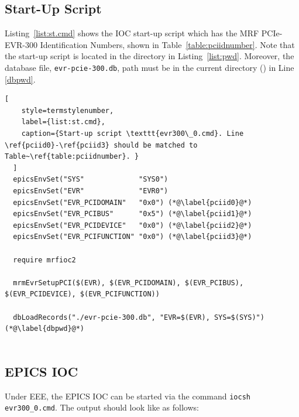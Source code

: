 \documentclass[11pt
  , a4paper
  , article
  , oneside
  , showtrims
]{memoir}
\begin{document}
\subsection{Start-Up Script}
Listing~\ref{list:st.cmd} shows the IOC start-up script which has the MRF PCIe-EVR-300 Identification Numbers, shown in Table~\ref{table:pciidnumber}. Note that the start-up script is located in the directory in Listing~\ref{list:pwd}. Moreover, the database file, \texttt{evr-pcie-300.db}, path must be in the current directory () in Line \ref{dbpwd}.


\begin{lstlisting}[
    style=termstylenumber,
    label={list:st.cmd},
    caption={Start-up script \texttt{evr300\_0.cmd}. Line \ref{pciid0}-\ref{pciid3} should be matched to Table~\ref{table:pciidnumber}. }
  ]
  epicsEnvSet("SYS"             "SYS0")
  epicsEnvSet("EVR"             "EVR0")
  epicsEnvSet("EVR_PCIDOMAIN"   "0x0") (*@\label{pciid0}@*)
  epicsEnvSet("EVR_PCIBUS"      "0x5") (*@\label{pciid1}@*)
  epicsEnvSet("EVR_PCIDEVICE"   "0x0") (*@\label{pciid2}@*)
  epicsEnvSet("EVR_PCIFUNCTION" "0x0") (*@\label{pciid3}@*)
  
  require mrfioc2
  
  mrmEvrSetupPCI($(EVR), $(EVR_PCIDOMAIN), $(EVR_PCIBUS), $(EVR_PCIDEVICE), $(EVR_PCIFUNCTION))
  
  dbLoadRecords("./evr-pcie-300.db", "EVR=$(EVR), SYS=$(SYS)") (*@\label{dbpwd}@*)
  
\end{lstlisting}

\subsection{EPICS IOC}
Under EEE, the EPICS IOC can be started via the command \texttt{iocsh evr300\_0.cmd}. The output should look like as follows:
\end{document}

